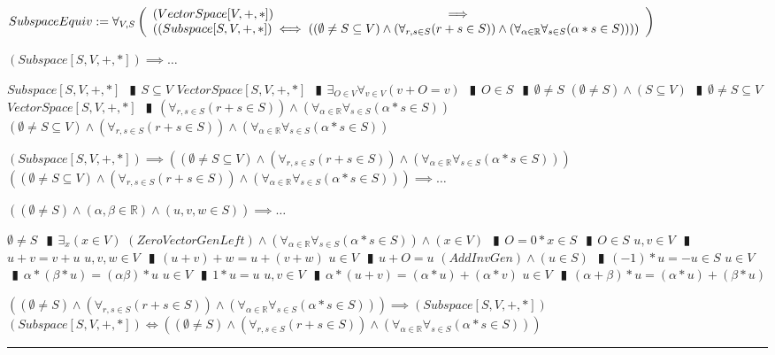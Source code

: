 \documentclass{book}
\newcommand{\abr}{:=}
\newcommand{\pipe}{$\phantom{(}\vrectangleblack\phantom{)}$}
\newcommand{\pr}[1]{\left(#1\right)}
\begin{document}
$SubspaceEquiv \abr \forall_{V, S}\left(\begin{array}{ll}
  (VectorSpace[V, +, *]) \hfill \implies \hfill \\
  \pr{(Subspace[S, V, +, *]) \iff \pr{(\emptyset \neq S \subseteq V) \land \pr{\forall_{r, s \in S}(r + s \in S)} \land \pr{\forall_{\alpha \in \mathbb{R}} \forall_{s \in S}(\alpha * s \in S)}}}
\end{array}\right)$
\begin{enumerate}
  \lit $(Subspace[S, V, +, *]) \implies \ldots$
  \begin{enumerate}
    \lit $Subspace[S, V, +, *]$ \pipe $S \subseteq V$
    \lit $VectorSpace[S, V, +, *]$ \pipe $\exists_{O \in V} \forall_{v \in V}(v + O = v)$ \pipe $O \in S$ \pipe $\emptyset \neq S$
    \lit $(\emptyset \neq S) \land (S \subseteq V)$ \pipe $\emptyset \neq S \subseteq V$
    \lit $VectorSpace[S, V, +, *]$ \pipe $\pr{\forall_{r, s \in S}(r + s \in S)} \land \pr{\forall_{\alpha \in \mathbb{R}} \forall_{s \in S}(\alpha * s \in S)}$
    \lit $(\emptyset \neq S \subseteq V) \land \pr{\forall_{r, s \in S}(r + s \in S)} \land \pr{\forall_{\alpha \in \mathbb{R}} \forall_{s \in S}(\alpha * s \in S)}$
  \end{enumerate}
  \lit $(Subspace[S, V, +, *]) \implies \pr{(\emptyset \neq S \subseteq V) \land \pr{\forall_{r, s \in S}(r + s \in S)} \land \pr{\forall_{\alpha \in \mathbb{R}} \forall_{s \in S}(\alpha * s \in S)}}$
  \lit $\pr{(\emptyset \neq S \subseteq V) \land \pr{\forall_{r, s \in S}(r + s \in S)} \land \pr{\forall_{\alpha \in \mathbb{R}} \forall_{s \in S}(\alpha * s \in S)}} \implies \ldots$
  \begin{enumerate}
    \lit $\pr{(\emptyset \neq S) \land (\alpha, \beta \in \mathbb{R}) \land (u, v, w \in S)} \implies \ldots$
    \begin{enumerate}
      \lit $\emptyset \neq S$ \pipe $\exists_{x}(x \in V)$
      \lit $(ZeroVectorGenLeft) \land \pr{\forall_{\alpha \in \mathbb{R}} \forall_{s \in S}(\alpha * s \in S)} \land (x \in V)$ \pipe $O = 0 * x \in S$ \pipe $O \in S$
      \lit $u, v \in V$ \pipe $u + v = v + u$
      \lit $u, v, w \in V$ \pipe $(u + v) + w = u + (v + w)$
      \lit $u \in V$ \pipe $u + O = u$
      \lit $(AddInvGen) \land (u \in S)$ \pipe $(-1) * u = -u \in S$
      \lit $u \in V$ \pipe $\alpha * (\beta * u) = (\alpha \beta) * u$
      \lit $u \in V$ \pipe $1 * u = u$
      \lit $u, v \in V$ \pipe $\alpha * (u + v) = (\alpha * u) + (\alpha * v)$
      \lit $u \in V$ \pipe $(\alpha + \beta) * u = (\alpha * u) + (\beta * u)$
    \end{enumerate}
  \end{enumerate}
  \lit $\pr{(\emptyset \neq S) \land \pr{\forall_{r, s \in S}(r + s \in S)} \land \pr{\forall_{\alpha \in \mathbb{R}} \forall_{s \in S}(\alpha * s \in S)}} \implies (Subspace[S, V, +, *])$
  \lit $(Subspace[S, V, +, *]) \iff \pr{(\emptyset \neq S) \land \pr{\forall_{r, s \in S}(r + s \in S)} \land \pr{\forall_{\alpha \in \mathbb{R}} \forall_{s \in S}(\alpha * s \in S)}}$
\end{enumerate} \vspace{.75mm} \hrule \vspace{.75mm} \ \\ 
\end{document}
